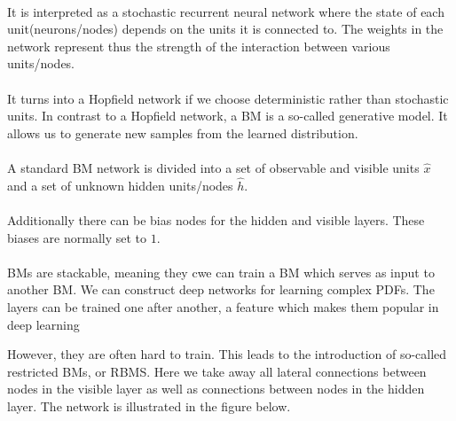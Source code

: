 \documentclass[%
oneside,                 %
final,                   %
10pt]{article}
\begin{document}
\paragraph{}
It is interpreted as a stochastic recurrent neural network where the
state of each unit(neurons/nodes) depends on the units it is connected
to. The weights in the network represent thus the strength of the
interaction between various units/nodes.



\paragraph{}
It turns into a Hopfield network if we choose deterministic rather
than stochastic units. In contrast to a Hopfield network, a BM is a
so-called generative model. It allows us to generate new samples from
the learned distribution.




\paragraph{}
A standard BM network is divided into a set of observable and visible units $\hat{x}$ and a set of unknown hidden units/nodes $\hat{h}$.




\paragraph{}
Additionally there can be bias nodes for the hidden and visible layers. These biases are normally set to $1$.




\paragraph{}
BMs are stackable, meaning they cwe can train a BM which serves as input to another BM. We can construct deep networks for learning complex PDFs. The layers can be trained one after another, a feature which makes them popular in deep learning



However, they are often hard to train. This leads to the introduction of so-called restricted BMs, or RBMS.
Here we take away all lateral connections between nodes in the visible layer as well as connections between nodes in the hidden layer. The network is illustrated in the figure below.
\end{document}
